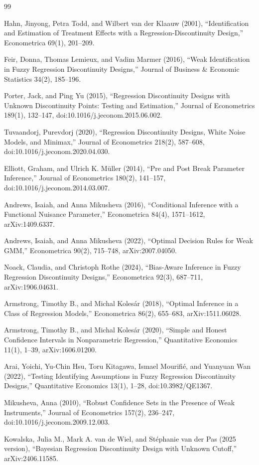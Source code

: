 \documentclass{article}
\begin{document}
\begin{thebibliography}{99}

   Hahn, Jinyong, Petra Todd, and Wilbert van der Klaauw (2001), ``Identification and Estimation of Treatment Effects with a Regression-Discontinuity Design,'' Econometrica 69(1), 201--209.

   Feir, Donna, Thomas Lemieux, and Vadim Marmer (2016), ``Weak Identification in Fuzzy Regression Discontinuity Designs,'' Journal of Business \& Economic Statistics 34(2), 185--196.

   Porter, Jack, and Ping Yu (2015), ``Regression Discontinuity Designs with Unknown Discontinuity Points: Testing and Estimation,'' Journal of Econometrics 189(1), 132--147, doi:10.1016/j.jeconom.2015.06.002.

   Tuvaandorj, Purevdorj (2020), ``Regression Discontinuity Designs, White Noise Models, and Minimax,'' Journal of Econometrics 218(2), 587--608, doi:10.1016/j.jeconom.2020.04.030.

   Elliott, Graham, and Ulrich K. M\"uller (2014), ``Pre and Post Break Parameter Inference,'' Journal of Econometrics 180(2), 141--157, doi:10.1016/j.jeconom.2014.03.007.

   Andrews, Isaiah, and Anna Mikusheva (2016), ``Conditional Inference with a Functional Nuisance Parameter,'' Econometrica 84(4), 1571--1612, arXiv:1409.6337.

   Andrews, Isaiah, and Anna Mikusheva (2022), ``Optimal Decision Rules for Weak GMM,'' Econometrica 90(2), 715--748, arXiv:2007.04050.

   Noack, Claudia, and Christoph Rothe (2024), ``Bias-Aware Inference in Fuzzy Regression Discontinuity Designs,'' Econometrica 92(3), 687--711, arXiv:1906.04631.

   Armstrong, Timothy B., and Michal Koles{\'a}r (2018), ``Optimal Inference in a Class of Regression Models,'' Econometrica 86(2), 655--683, arXiv:1511.06028.

   Armstrong, Timothy B., and Michal Koles{\'a}r (2020), ``Simple and Honest Confidence Intervals in Nonparametric Regression,'' Quantitative Economics 11(1), 1--39, arXiv:1606.01200.

   Arai, Yoichi, Yu-Chin Hsu, Toru Kitagawa, Ismael Mourifi{\'e}, and Yuanyuan Wan (2022), ``Testing Identifying Assumptions in Fuzzy Regression Discontinuity Designs,'' Quantitative Economics 13(1), 1--28, doi:10.3982/QE1367.

   Mikusheva, Anna (2010), ``Robust Confidence Sets in the Presence of Weak Instruments,'' Journal of Econometrics 157(2), 236--247, doi:10.1016/j.jeconom.2009.12.003.

   Kowalska, Julia M., Mark A. van de Wiel, and St{\'e}phanie van der Pas (2025 version), ``Bayesian Regression Discontinuity Design with Unknown Cutoff,'' arXiv:2406.11585.

\end{thebibliography}
\end{document}
